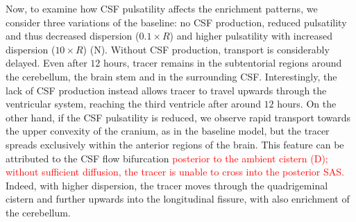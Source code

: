 \documentclass[fleqn,10pt]{wlscirep}
\newcommand{\discuss}[1]{\textcolor{red}{#1}}
\begin{document}
Now, to examine how CSF pulsatility affects the enrichment patterns,
we consider three variations of the baseline: no CSF production,
reduced pulsatility and thus decreased dispersion ($0.1 \times R$) and
higher pulsatility with increased dispersion ($10 \times R$)
(N). Without CSF production, transport is considerably
delayed. Even after $12$ hours, tracer remains in the subtentorial
regions around the cerebellum, the brain stem and in the surrounding
CSF. Interestingly, the lack of CSF production instead allows tracer
to travel upwards through the ventricular system, reaching the third
ventricle after around $12$ hours. On the other hand, if the CSF
pulsatility is reduced, we observe rapid transport towards the upper
convexity of the cranium, as in the baseline model, but the tracer
spreads exclusively within the anterior regions of the brain. This
feature can be attributed to the CSF flow bifurcation
\discuss{posterior to the ambient cistern (D); without
  sufficient diffusion, the tracer is unable to cross into the
  posterior SAS.} Indeed, with higher dispersion, the tracer moves
through the quadrigeminal cistern and further upwards into the
longitudinal fissure, with also enrichment of the cerebellum.


\end{document}
